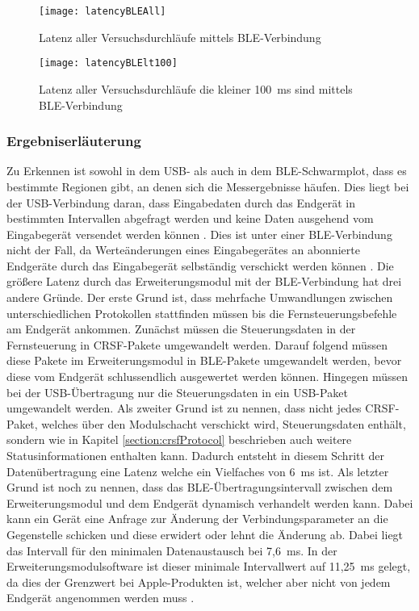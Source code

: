 \begin{figure}[H]
    \centering
    \texttt{[image: latencyBLEAll]}
    \caption{Latenz aller Versuchsdurchläufe mittels \ac{BLE}-Verbindung}
    \label{fig:latencyBLEAll}
\end{figure}

\begin{figure}[H]
    \centering
    \texttt{[image: latencyBLElt100]}
    \caption{Latenz aller Versuchsdurchläufe die kleiner 100~ms sind mittels \ac{BLE}-Verbindung}
    \label{fig:latencyBLElt100}
\end{figure}

\subsubsection{Ergebniserläuterung}
\label{section:resultExplanation}
Zu Erkennen ist sowohl in dem USB- als auch in dem \ac{BLE}-Schwarmplot, dass es bestimmte Regionen gibt, an denen sich die Messergebnisse häufen. Dies liegt bei der USB-Verbindung daran, dass Eingabedaten durch das Endgerät in bestimmten Intervallen abgefragt werden und keine Daten ausgehend vom Eingabegerät versendet werden können \cites[S.~48f., S.~277ff.]{usb2Spec}[S.~5]{wimmerLatenzStation}. Dies ist unter einer \ac{BLE}-Verbindung nicht der Fall, da Werteänderungen eines Eingabegerätes an abonnierte Endgeräte durch das Eingabegerät selbständig verschickt werden können \cite[S.~1516]{bluetoothCore}. Die größere Latenz durch das Erweiterungsmodul mit der \ac{BLE}-Verbindung hat drei andere Gründe. Der erste Grund ist, dass mehrfache Umwandlungen zwischen unterschiedlichen Protokollen stattfinden müssen bis die Fernsteuerungsbefehle am Endgerät ankommen. Zunächst müssen die Steuerungsdaten in der Fernsteuerung in CRSF-Pakete umgewandelt werden. Darauf folgend müssen diese Pakete im Erweiterungsmodul in BLE-Pakete umgewandelt werden, bevor diese vom Endgerät schlussendlich ausgewertet werden können. Hingegen müssen bei der USB-Übertragung nur die Steuerungsdaten in ein USB-Paket umgewandelt werden. Als zweiter Grund ist zu nennen, dass nicht jedes CRSF-Paket, welches über den Modulschacht verschickt wird, Steuerungsdaten enthält, sondern wie in Kapitel \ref{section:crsfProtocol} beschrieben auch weitere Statusinformationen enthalten kann. Dadurch entsteht in diesem Schritt der Datenübertragung eine Latenz welche ein Vielfaches von 6~ms ist. Als letzter Grund ist noch zu nennen, dass das \ac{BLE}-Übertragungsintervall zwischen dem Erweiterungsmodul und dem Endgerät dynamisch verhandelt werden kann. Dabei kann ein Gerät eine Anfrage zur Änderung der Verbindungsparameter an die Gegenstelle schicken und diese erwidert oder lehnt die Änderung ab. Dabei liegt das Intervall für den minimalen Datenaustausch bei 7,6~ms. In der Erweiterungsmodulsoftware ist dieser minimale Intervallwert auf 11,25~ms gelegt, da dies der Grenzwert bei Apple-Produkten ist, welcher aber nicht von jedem Endgerät angenommen werden muss \cite[S.~188]{appleDesignGuide}. \cite{bleConnectionParameter}

